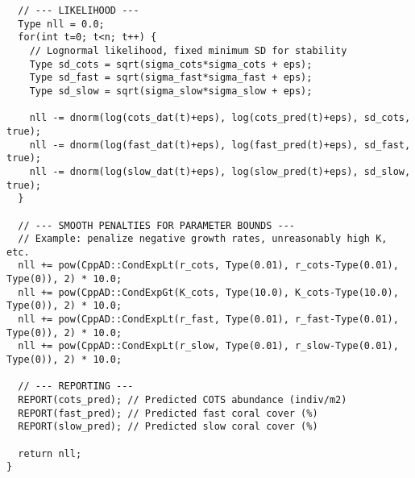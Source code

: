 \begin{lstlisting}
  // --- LIKELIHOOD ---
  Type nll = 0.0;
  for(int t=0; t<n; t++) {
    // Lognormal likelihood, fixed minimum SD for stability
    Type sd_cots = sqrt(sigma_cots*sigma_cots + eps);
    Type sd_fast = sqrt(sigma_fast*sigma_fast + eps);
    Type sd_slow = sqrt(sigma_slow*sigma_slow + eps);

    nll -= dnorm(log(cots_dat(t)+eps), log(cots_pred(t)+eps), sd_cots, true);
    nll -= dnorm(log(fast_dat(t)+eps), log(fast_pred(t)+eps), sd_fast, true);
    nll -= dnorm(log(slow_dat(t)+eps), log(slow_pred(t)+eps), sd_slow, true);
  }

  // --- SMOOTH PENALTIES FOR PARAMETER BOUNDS ---
  // Example: penalize negative growth rates, unreasonably high K, etc.
  nll += pow(CppAD::CondExpLt(r_cots, Type(0.01), r_cots-Type(0.01), Type(0)), 2) * 10.0;
  nll += pow(CppAD::CondExpGt(K_cots, Type(10.0), K_cots-Type(10.0), Type(0)), 2) * 10.0;
  nll += pow(CppAD::CondExpLt(r_fast, Type(0.01), r_fast-Type(0.01), Type(0)), 2) * 10.0;
  nll += pow(CppAD::CondExpLt(r_slow, Type(0.01), r_slow-Type(0.01), Type(0)), 2) * 10.0;

  // --- REPORTING ---
  REPORT(cots_pred); // Predicted COTS abundance (indiv/m2)
  REPORT(fast_pred); // Predicted fast coral cover (%)
  REPORT(slow_pred); // Predicted slow coral cover (%)

  return nll;
}
\end{lstlisting}

